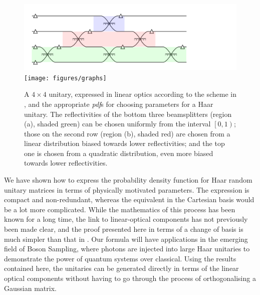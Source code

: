 \documentclass[aps,prl,twocolumn]{revtex4}
\newcommand{\by}{\times}
\newcommand{\pdf}{{\it pdf}}
\begin{document}
\begin{figure}[h]
  \centering
  \includegraphics{figures/example}\\
  \vspace{5mm}
  \texttt{[image: figures/graphs]}
  \caption{A \(4 \by 4\) unitary, expressed in linear optics according to the
    scheme in \cite{re-prl-73-58}, and the appropriate \pdf{}s for choosing
    parameters for a Haar unitary. The reflectivities of the bottom three
    beamsplitters (region (a), shaded green) can be chosen uniformly from the
    interval \(\left[ 0,1 \right)\); those on the second row (region (b),
    shaded red) are chosen from a linear distribution biased towards lower
    reflectivities; and the top one is chosen from a quadratic distribution,
    even more biased towards lower reflectivities.}
  \label{fig:example}
\end{figure}
  
We have shown how to express the probability density function for Haar random
unitary matrices in terms of physically motivated parameters. The expression is
compact and non-redundant, whereas the equivalent in the Cartesian basis would
be a lot more complicated. While the mathematics of this process has been known
for a long time, the link to linear-optical components has not previously been
made clear, and the proof presented here in terms of a change of basis is much
simpler than that in \cite{sp-jpa-43-385306}. Our formula will have
applications in the emerging field of Boson Sampling, where photons are
injected into large Haar unitaries to demonstrate the power of quantum systems
over classical. Using the results contained here, the unitaries can be
generated directly in terms of the linear optical components without having to
go through the process of orthogonalising a Gaussian matrix.


\end{document}
